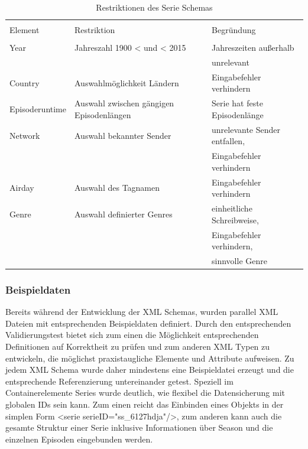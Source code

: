 \begin{table}[H]
\caption{Restriktionen des Serie Schemas}


\begin{tabular}{l l l}
\\ [-0.5ex]

\hline\hline
\\ [-0.5ex]
Element & Restriktion & Begründung
\\ [1.5ex]
\hline
\\ [-0.5ex]
Year & Jahreszahl 1900 < und < 2015 & Jahreszeiten außerhalb\\[1ex]
&&unrelevant \\[3ex]

Country & Auswahlmöglichkeit Ländern & Eingabefehler verhindern\\[3ex]
Episoderuntime & Auswahl zwischen gängigen Episodenlängen& Serie hat feste Episodenlänge\\[3ex]
Network & Auswahl bekannter Sender & unrelevante Sender entfallen,\\[3ex]
&&Eingabefehler verhindern\\[3ex]

Airday & Auswahl des Tagnamen & Eingabefehler verhindern\\[3ex]
Genre & Auswahl definierter Genres & einheitliche Schreibweise,\\[1ex]
&&Eingabefehler verhindern,\\[1ex]
&& sinnvolle Genre\\[2ex]

\hline
\end{tabular}
\label{tab:restriktionenderxsd}
\end{table}



\subsubsection{Beispieldaten}

Bereits während der Entwicklung der XML Schemas, wurden parallel XML Dateien mit entsprechenden Beispieldaten definiert. Durch den entsprechenden Validierungstest bietet sich zum einen die Möglichkeit entsprechenden Definitionen auf Korrektheit zu prüfen und zum anderen XML Typen zu entwickeln, die möglichst praxistaugliche Elemente und Attribute aufweisen. Zu jedem XML Schema wurde daher mindestens eine Beispieldatei erzeugt und die entsprechende Referenzierung untereinander getest. Speziell im Containerelemente Series wurde deutlich, wie flexibel die Datensicherung mit globalen IDs sein kann. Zum einen reicht das Einbinden eines Objekts in der simplen Form <serie serieID="ss\_6127hdja"/>, zum anderen kann auch die gesamte Struktur einer Serie inklusive Informationen über Season und die einzelnen Episoden eingebunden werden. \\

